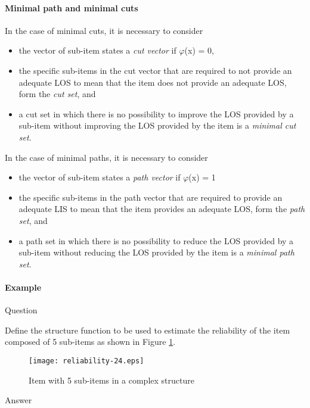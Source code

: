 \paragraph{Minimal path and minimal cuts}
In the case of minimal cuts, it is necessary to consider
\begin{itemize}
	\item the vector of sub-item states a \textit{cut vector} if \textit{$\varphi{}$}(x) =
0,
	\item the specific sub-items in the cut vector that are required to not provide an
adequate LOS to mean that the item does not provide an adequate LOS, form the
\textit{cut set}, and
	\item a cut set in which there is no possibility to improve the LOS provided by a
sub-item without improving the LOS provided by the item is a \textit{minimal cut
set}.
\end{itemize}
In the case of minimal paths, it is necessary to consider
\begin{itemize}
	\item the vector of sub-item states a \textit{path vector} if \textit{$\varphi{}$}(x)
= 1
	\item the specific sub-items in the path vector that are required to provide an
adequate LIS to mean that the item provides an adequate LOS, form the
\textit{path set}, and
	\item a path set in which there is no possibility to reduce the LOS provided by a
sub-item without reducing the LOS provided by the item is a \textit{minimal path
set}.
\end{itemize}
\paragraph{Example}
Question

Define the structure function to be used to estimate the reliability of the item
composed of 5 sub-items as shown in Figure \ref{reliability-24}.
%
\begin{figure}[h]
\texttt{[image: reliability-24.eps]}
\caption{Item with 5 sub-items in a complex structure}\label{reliability-24}
\end{figure}

Answer


